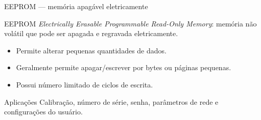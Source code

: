\begin{frame}[t]{EEPROM --- memória apagável eletricamente}
  \begin{block}{EEPROM}
    \textit{Electrically Erasable Programmable Read-Only Memory}: memória não volátil que pode ser apagada e regravada eletricamente.
  \end{block}
  \begin{itemize}
    \item Permite alterar pequenas quantidades de dados.
    \item Geralmente permite apagar/escrever por bytes ou páginas pequenas.
    \item Possui número limitado de ciclos de escrita.
  \end{itemize}
  \begin{exampleblock}{Aplicações}
    Calibração, número de série, senha, parâmetros de rede e configurações do usuário.
  \end{exampleblock}
\end{frame}
